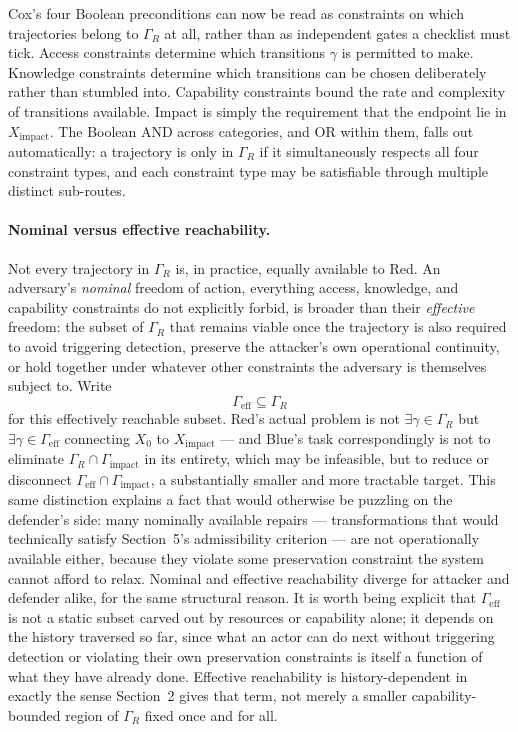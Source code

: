 \documentclass[11pt]{article}
\begin{document}
Cox's four Boolean preconditions can now be read as constraints on which trajectories belong to $\Gamma_R$ at all, rather than as independent gates a checklist must tick. Access constraints determine which transitions $\gamma$ is permitted to make. Knowledge constraints determine which transitions can be chosen deliberately rather than stumbled into. Capability constraints bound the rate and complexity of transitions available. Impact is simply the requirement that the endpoint lie in $X_{\mathrm{impact}}$. The Boolean AND across categories, and OR within them, falls out automatically: a trajectory is only in $\Gamma_R$ if it simultaneously respects all four constraint types, and each constraint type may be satisfiable through multiple distinct sub-routes.

\paragraph{Nominal versus effective reachability.} Not every trajectory in $\Gamma_R$ is, in practice, equally available to Red. An adversary's \emph{nominal} freedom of action, everything access, knowledge, and capability constraints do not explicitly forbid, is broader than their \emph{effective} freedom: the subset of $\Gamma_R$ that remains viable once the trajectory is also required to avoid triggering detection, preserve the attacker's own operational continuity, or hold together under whatever other constraints the adversary is themselves subject to. Write
\begin{equation}
\Gamma_{\mathrm{eff}} \subseteq \Gamma_R
\end{equation}
for this effectively reachable subset. Red's actual problem is not $\exists \gamma \in \Gamma_R$ but $\exists \gamma \in \Gamma_{\mathrm{eff}}$ connecting $X_0$ to $X_{\mathrm{impact}}$ --- and Blue's task correspondingly is not to eliminate $\Gamma_R \cap \Gamma_{\mathrm{impact}}$ in its entirety, which may be infeasible, but to reduce or disconnect $\Gamma_{\mathrm{eff}} \cap \Gamma_{\mathrm{impact}}$, a substantially smaller and more tractable target. This same distinction explains a fact that would otherwise be puzzling on the defender's side: many nominally available repairs --- transformations that would technically satisfy Section~5's admissibility criterion --- are not operationally available either, because they violate some preservation constraint the system cannot afford to relax. Nominal and effective reachability diverge for attacker and defender alike, for the same structural reason. It is worth being explicit that $\Gamma_{\mathrm{eff}}$ is not a static subset carved out by resources or capability alone; it depends on the history traversed so far, since what an actor can do next without triggering detection or violating their own preservation constraints is itself a function of what they have already done. Effective reachability is history-dependent in exactly the sense Section~2 gives that term, not merely a smaller capability-bounded region of $\Gamma_R$ fixed once and for all.
\end{document}
